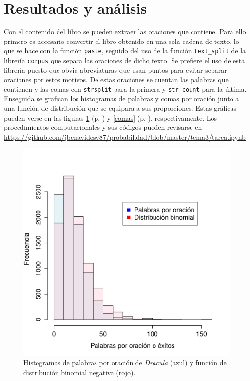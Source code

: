 \documentclass[paper=leter, fontsize=11pt]{scrartcl}
\numberwithin{equation}{section}		%
\numberwithin{figure}{section}			%
\numberwithin{table}{section}				%
\begin{document}
\section{Resultados y análisis}
Con el contenido del libro se pueden extraer las oraciones que contiene. Para ello primero es necesario convertir el libro obtenido en una sola cadena de texto, lo que se hace con la función \texttt{paste}, seguido del uso de la función \texttt{text\_split} de la librería \texttt{corpus} que separa las oraciones de dicho texto. Se prefiere el uso de esta librería puesto que obvia abreviaturas que usan puntos para evitar separar oraciones por estos motivos. De estas oraciones se cuentan las palabras que contienen y las comas con \texttt{strsplit} para la primera y \texttt{str\_count} para la última. Enseguida se grafican los histogramas de palabras y comas por oración junto a una función de distribución que se equipara a sus proporciones. Estas gráficas pueden verse en las figuras \ref{palabras} (p. \pageref{palabras}) y \ref{comas} (p. \pageref{comas}), respectivamente. Los procedimientos computacionales y sus códigos pueden revisarse en \url{https://github.com/jbenavidesv87/probabilidad/blob/master/tema3/tarea.ipynb}

\begin{figure}
    \centering
    \includegraphics[width=1\textwidth]{palabras.pdf}
    \caption{Histogramas de palabras por oración de \textit{Dracula} (azul) y función de distribución binomial negativa (rojo).}
    \label{palabras}
\end{figure}
\end{document}
